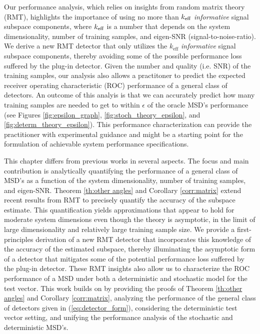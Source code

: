 Our performance analysis, which relies on insights from random matrix theory (RMT), highlights the importance of using no more than $k_\text{eff}$ \textit{informative} signal subspace components, where $k_\text{eff}$ is a number that depends on the system dimensionality, number of training samples, and eigen-SNR (signal-to-noise-ratio). We derive a new RMT detector that only utilizes the $k_\text{eff}$ \textit{informative} signal subspace components, thereby avoiding some of the possible performance loss suffered by the plug-in detector. Given the number and quality (i.e. SNR) of the training samples, our analysis also allows a practitoner to predict the expected receiver operating characteristic (ROC) performance of a general class of detectors. An outcome of this analyis is that we can accurately predict how many training samples are needed to get to within $\epsilon$ of the oracle MSD's performance (see Figures \ref{fig:epsilon_graph}, \ref{fig:stoch_theory_epsilon}, and \ref{fig:determ_theory_epsilon}). This performance characterization can provide the practitioner with experimental guidance and might be a starting point for the formulation of achievable system performance specifications.

This chapter differs from previous works in several aspects. The focus and main contribution is analytically quantifying the performance of a general class of MSD's as a function of the system dimensionality, number of training samples, and eigen-SNR. Theorem \ref{th:other angles} and Corollary \ref{corr:matrix} extend recent results from RMT \cite{paul2007asymptotics,benaych2011eigenvalues, benaych2011singular} to precisely quantify the accuracy of the subspace estimate. This quantification yields approximations that appear to hold for moderate system dimensions even though the theory is asymptotic, in the limit of large dimensionality and relatively large training sample size. We provide a first-principles derivation of a new RMT detector that incorporates this knowledge of the accuracy of the estimated subspace, thereby illuminating the asymptotic form of a detector that mitigates some of the potential performance loss suffered by the plug-in detector. These RMT insights also allow us to characterize the ROC performance of a MSD under both a deterministic and stochastic model for the test vector. This work builds on \cite{asendorf2011msd} by providing the proofs of Theorem \ref{th:other angles} and Corollary \ref{corr:matrix}, analyzing the performance of the general class of detectors given in (\ref{eq:detector_form}), considering the deterministic test vector setting, and unifying the performance analysis of the stochastic and deterministic MSD's.

